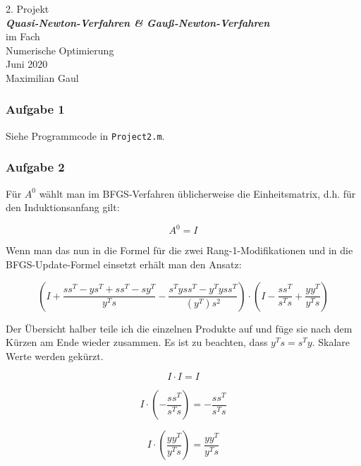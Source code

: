 \documentclass[a4paper, 12pt]{report}
\begin{document}
\begin{center}
    \vspace*{2em}
    \normalsize 2. Projekt\\
    \vspace*{1em}
    \normalsize \textbf{\textit{Quasi-Newton-Verfahren \& Gauß-Newton-Verfahren}}\\
    \vspace*{4em}
    \normalsize im Fach\\
    \vspace*{1em}
    \large Numerische Optimierung\\
    \vspace*{30em}
    \normalsize Juni 2020\\
    \vspace*{1em}
    \normalsize Maximilian Gaul
\end{center}

\thispagestyle{empty}

\newpage

\subsubsection{Aufgabe 1}
Siehe Programmcode in \lstinline[basicstyle=\ttfamily\color{black}]|Project2.m|.

\subsubsection{Aufgabe 2}
Für $A^0$ wählt man im BFGS-Verfahren üblicherweise die Einheitsmatrix, d.h. für den Induktionsanfang gilt:

$$A^0 = I$$

Wenn man das nun in die Formel für die zwei Rang-1-Modifikationen und in die BFGS-Update-Formel einsetzt erhält man den Ansatz:

$$\left( I + \frac{ss^T - ys^T + ss^T - sy^T}{y^Ts} - \frac{s^Tyss^T - y^Tyss^T}{(y^T)s^2}\right)\cdot\left(I - \frac{ss^T}{s^Ts} + \frac{yy^T}{y^Ts} \right)$$

Der Übersicht halber teile ich die einzelnen Produkte auf und füge sie nach dem Kürzen am Ende wieder zusammen.
Es ist zu beachten, dass $y^Ts = s^Ty$. Skalare Werte werden gekürzt.

$$I\cdot I = I$$

$$I \cdot \left(-\frac{ss^T}{s^Ts}\right) = -\frac{ss^T}{s^Ts}$$

$$I\cdot \left(\frac{yy^T}{y^Ts}\right) = \frac{yy^T}{y^Ts}$$
\end{document}

